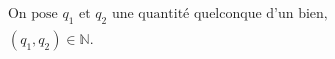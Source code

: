\documentclass[preview]{standalone}
\begin{document}
\begin{align*}
\text{On pose } q_1 \text{ et } q_2 \text{ une quantité quelconque d'un bien},\\ (q_1,q_2)\in \mathbb{N}.
\end{align*}
\end{document}
